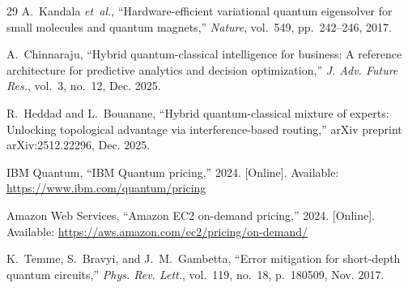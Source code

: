 \documentclass[10pt,conference]{IEEEtran}
\begin{document}
\begin{thebibliography}{29}
A.~Kandala \emph{et~al.}, ``Hardware-efficient variational quantum eigensolver for small molecules and quantum magnets,'' \emph{Nature}, vol.~549, pp.~242--246, 2017.

A.~Chinnaraju, ``Hybrid quantum-classical intelligence for business: A reference architecture for predictive analytics and decision optimization,'' \emph{J. Adv. Future Res.}, vol.~3, no.~12, Dec. 2025.

R.~Heddad and L.~Bouanane, ``Hybrid quantum-classical mixture of experts: Unlocking topological advantage via interference-based routing,'' arXiv preprint arXiv:2512.22296, Dec. 2025.

IBM Quantum, ``IBM Quantum pricing,'' 2024. [Online]. Available: \url{https://www.ibm.com/quantum/pricing}

Amazon Web Services, ``Amazon EC2 on-demand pricing,'' 2024. [Online]. Available: \url{https://aws.amazon.com/ec2/pricing/on-demand/}

K.~Temme, S.~Bravyi, and J.~M.~Gambetta, ``Error mitigation for short-depth quantum circuits,'' \emph{Phys. Rev. Lett.}, vol.~119, no.~18, p.~180509, Nov. 2017.

\end{thebibliography}
\end{document}

